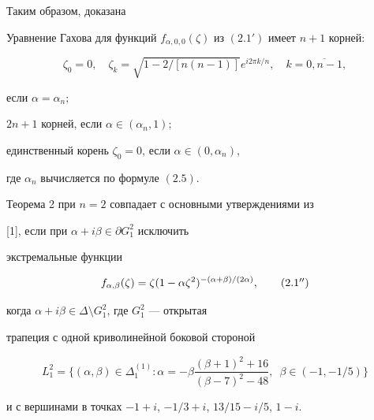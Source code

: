 Таким образом, доказана





\begin{thm}


Уравнение Гахова для функций $f_{\alpha,0,0}


(\zeta)$ из $(2.1')$ имеет $n+1$ корней\/${:}$


$$


\zeta_0=0, \quad


\zeta_k=\sqrt{1-2/[n(n-1)]}e^


{i2\pi k/n},\quad k=\overline{0, n-1},


$$


если $\alpha=\alpha_n;$


$2n+1$ корней, если $\alpha\in(\alpha_n,1);$


единственный корень $\zeta_0=0$, если $\alpha\in(0,\alpha_n)$,


где $\alpha_n$ вычисляется по формуле $(2.5)$.


\end{thm}








Теорема 2 при $n=2$ совпадает с основными утверждениями из


[1], если при $\alpha+i\beta\in\partial G_1^2$ исключить


экстремальные функции


\begin{equation}


f_{\alpha,\beta}(\zeta)=\zeta(1-\alpha\zeta^2)^{-(\alpha+\beta)/(2\alpha)},


\tag{2.1${}''$}


\end{equation}


когда $\alpha+i\beta\in\Delta\setminus G_1^2$, где $G_1^2$ --- открытая


трапеция с одной криволинейной боковой стороной


$$


L_1^2=\bigg\{(\alpha,\beta)\in\Delta_1^{(1)}: \alpha=-\beta


\frac{(\beta+1)^2+16}{(\beta-7)^2-48},\ \; \beta\in(-1,-1/5)\bigg\}


$$


и с вершинами в точках $-1+i$, $-1/3+i$, $13/15-i/5$, $1-i$.






